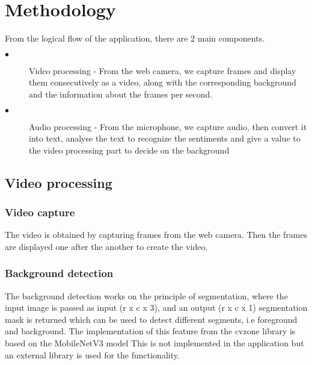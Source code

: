 
\chapter{Methodology} %

\label{ChapterX} %


From the logical flow of the application, there are 2 main components.
\begin{description}
\item[$\bullet$] Video processing - From the web camera, we capture frames and display them consecutively as a video, along with the corresponding background and the information about the frames per second.

\item[$\bullet$] Audio processing - From the microphone, we capture audio, then convert it into text, analyse the text to recognize the sentiments and give a value to the video processing part to decide on the background

\end{description}
\section{Video processing}
\subsection{Video capture}
The video is obtained by capturing frames from the web camera. Then the frames are displayed one after the another to create the video.

\subsection{Background detection}
The background detection works on the principle of segmentation, where the input image is passed as input (r x c x 3), and an output (r x c x 1) segmentation mask is returned which can be used to detect different segments, i.e foreground and background. The implementation of this feature from the cvzone library is based on the MobileNetV3 model This is not implemented in the application but an external library is used for the functionality.

